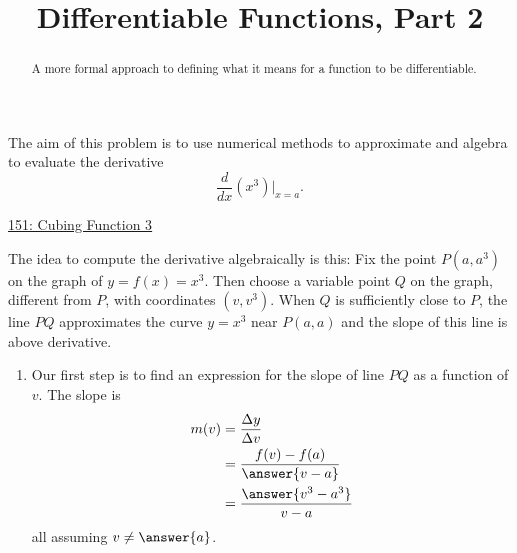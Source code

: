 \documentclass{ximera}
\title{Differentiable Functions, Part 2}
\begin{document}
\begin{abstract}
A more formal approach to defining what it means for a function to be differentiable.
\end{abstract}
\maketitle


\begin{exploration}   \label{Expdsfdsftttehh030}
The aim of this problem is to use numerical methods to approximate and algebra to evaluate the derivative
\[
   \frac{d}{dx}\left( x^3 \right) \Big|_{x=a}.
\]

\begin{onlineOnly}
    \begin{center}
\end{center}
\end{onlineOnly}

\href{https://www.desmos.com/calculator/rto22qzlvm}{151: Cubing Function 3}


The idea to compute the derivative algebraically is this: Fix the point $P(a,a^3)$ on the graph of $y=f(x)=x^3$. Then choose a variable point $Q$ on the graph, different from $P$, with coordinates $(v,v^3)$. When $Q$ is sufficiently close to $P$, the line $PQ$ approximates the curve $y=x^3$ near $P(a,a)$ and the slope of this line is above derivative. 

\begin{enumerate}
\item Our first step is to find an expression for the slope of line $PQ$ as a function of $v$. The slope is
\begin{align*}
        m(v) &= \frac{\Delta y}{\Delta v}  \\
                & = \frac{f(v) - f(a)}{\answer{v-a}} \\
                & = \frac{\answer{v^3-a^3}}{v-a} \\
\end{align*}
all assuming $v\neq \answer{a}$.



\end{enumerate}
\end{exploration}
\end{document}
